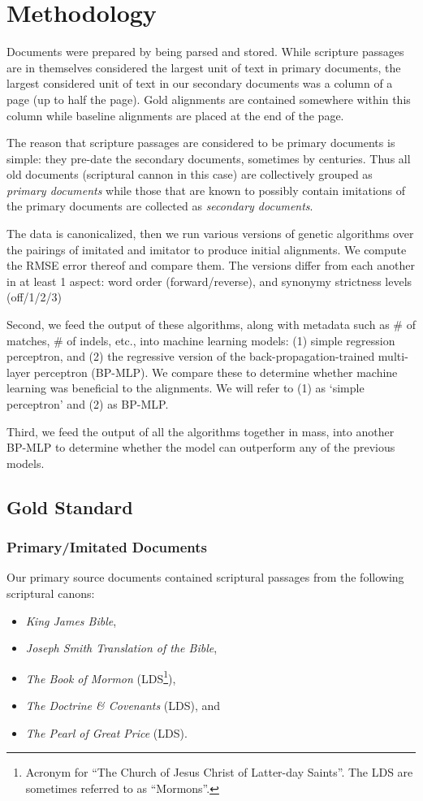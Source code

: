 \section {Methodology}
Documents were prepared by being parsed and stored. While scripture passages are in themselves considered the largest unit of text in primary documents, the largest considered unit of text in our secondary documents was a column of a page (up to half the page). Gold alignments are contained somewhere within this column while baseline alignments are placed at the end of the page.

The reason that scripture passages are considered to be primary documents is simple: they pre-date the secondary documents, sometimes by centuries. Thus all old documents (scriptural cannon in this case) are collectively grouped as \textit{primary documents} while those that are known to possibly contain imitations of the primary documents are collected as \textit{secondary documents}.

The data is canonicalized, then we run various versions of genetic algorithms over the pairings of imitated and imitator to produce initial alignments. We compute the RMSE error thereof and compare them. The versions differ from each another in at least 1 aspect: word order (forward/reverse), and synonymy strictness levels (off/1/2/3)

Second, we feed the output of these algorithms, along with metadata such as \# of matches, \# of indels, etc., into machine learning models: (1) simple regression perceptron, and (2) the regressive version of the back-propagation-trained multi-layer perceptron (BP-MLP). We compare these to determine whether machine learning was beneficial to the alignments. We will refer to (1) as `simple perceptron' and (2) as BP-MLP.

Third, we feed the output of all the algorithms together in mass, into another BP-MLP to determine whether the model can outperform any of the previous models.

\subsection{Gold Standard}
\subsubsection{Primary/Imitated Documents}
Our primary source documents contained scriptural passages from the following scriptural canons:
	\begin{itemize}
		\item \textit{King James Bible},
		\item \textit{Joseph Smith Translation of the Bible},
		\item \textit{The Book of Mormon} (LDS\footnote{Acronym for ``The Church of Jesus Christ of Latter-day Saints''. The LDS are sometimes referred to as ``Mormons''.}),
		\item \textit{The Doctrine \& Covenants} (LDS), and
		\item \textit{The Pearl of Great Price} (LDS). 
	\end{itemize}

